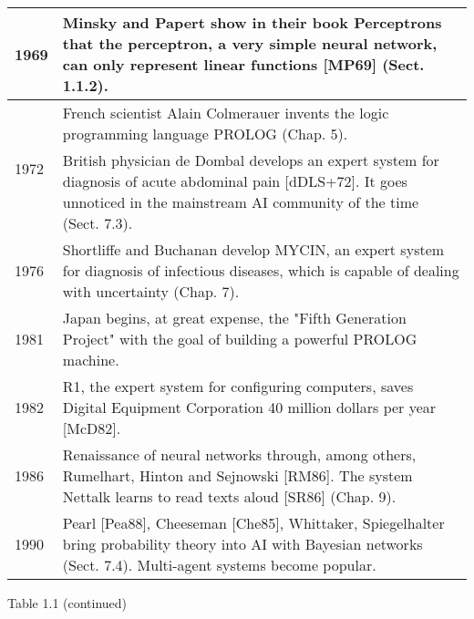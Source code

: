 \documentclass[10pt]{article}
\begin{document}
\begin{center}
\begin{tabular}{|l|l|}
\hline
1969 & Minsky and Papert show in their book Perceptrons that the perceptron, a very simple neural network, can only represent linear functions [MP69] (Sect. 1.1.2). \\
\hline
\multirow[t]{2}{*}{1972} & French scientist Alain Colmerauer invents the logic programming language PROLOG (Chap. 5). \\
\hline
 & British physician de Dombal develops an expert system for diagnosis of acute abdominal pain [dDLS+72]. It goes unnoticed in the mainstream AI community of the time (Sect. 7.3). \\
\hline
1976 & Shortliffe and Buchanan develop MYCIN, an expert system for diagnosis of infectious diseases, which is capable of dealing with uncertainty (Chap. 7). \\
\hline
1981 & Japan begins, at great expense, the "Fifth Generation Project" with the goal of building a powerful PROLOG machine. \\
\hline
1982 & R1, the expert system for configuring computers, saves Digital Equipment Corporation 40 million dollars per year [McD82]. \\
\hline
1986 & Renaissance of neural networks through, among others, Rumelhart, Hinton and Sejnowski [RM86]. The system Nettalk learns to read texts aloud [SR86] (Chap. 9). \\
\hline
1990 & Pearl [Pea88], Cheeseman [Che85], Whittaker, Spiegelhalter bring probability theory into AI with Bayesian networks (Sect. 7.4). Multi-agent systems become popular. \\
\hline
\end{tabular}
\end{center}

Table 1.1 (continued)
\end{document}
